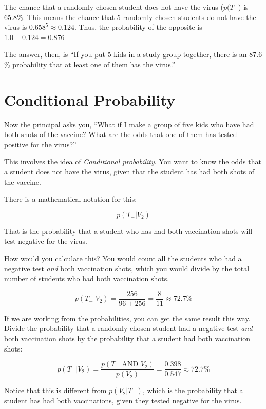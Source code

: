 The chance that a randomly chosen student does not have the virus
($p(T_{-}$) is 65.8\%.  This means the chance that 5 randomly chosen
students do not have the virus is $0.658^5 \approx 0.124$. Thus, the probability of the
opposite is $1.0 - 0.124 = 0.876$

The answer, then, is ``If you put 5 kids in a study group together,
there is an 87.6 \% probability that at least one of them has the
virus.''

\section{Conditional Probability}
Now the principal asks you, ``What if I make a group of five kids who
have had both shots of the vaccine? What are the odds that one of them
has tested positive for the virus?''

This involves the idea of \textit{Conditional probability}.  You want
to know the odds that a student does not have the virus, given that
the student has had both shots of the vaccine.

There is a mathematical notation for this:

$$p(T_{-} | V_{2})$$

That is the probability that a student who has had both vaccination
shots will test negative for the virus.

How would you calculate this? You would count all the students who had
a negative test \textit{and} both vaccination shots, which you would
divide by the total number of students who had both vaccination shots.

$$p(T_{-} | V_{2}) = \frac{256}{96 + 256} = \frac{8}{11} \approx 72.7\%$$

If we are working from the probabilities, you can get the same result
this way. Divide the probability that a randomly chosen student had a
negative test \textit{and} both vaccination shots by the probability
that a student had both vaccination shots:

$$p(T_{-} | V_{2}) = \frac{p(T_{-} \text{ AND } V_{2})}{p(V_{2})} =  \frac{0.398}{0.547} \approx 72.7\%$$

Notice that this is different from $p( V_{2} | T_{-})$, which is the
probability that a student has had both vaccinations, given they
tested negative for the virus.

